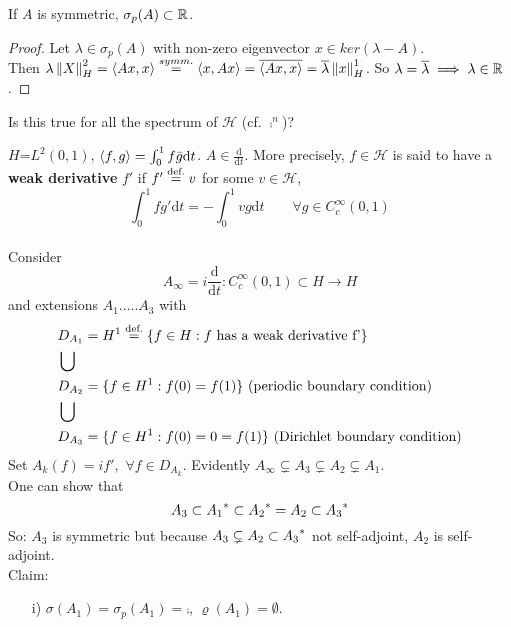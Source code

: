 \documentclass{article}
\begin{document}
\begin{lemma}
	If $A$ is symmetric, $\sigma_p(A)\subset\mathbb{R}$.

\end{lemma}
	\begin{proof}
		Let $\lambda\in\sigma_p(A)$ with non-zero eigenvector $x\in ker(\lambda-A)$. \\
		Then $\lambda\left\|{X}\right\|_H^2=\left<{Ax},{x}\right>\stackrel{symm.}{=}\left<{x},{Ax}\right>=\overline{\left<{Ax},{x}\right>}=\overline{\lambda}\left\|{x}\right\|_H^1$. So $\lambda=\overline{\lambda}\implies \lambda\in\mathbb{R}$.
	\end{proof}
Is this true for all the spectrum of $\mathcal{H}$ (cf. $\comp^n$)?
\begin{example}\nl
	$H$=$L^2(0,1)$, $\left<{f},{g}\right>=\int_0^1f\bar{g} \mathrm{d}t$. $A\in\frac{\mathrm{d}}{\mathrm{d}t}$. More precisely, $f\in\mathcal{H}$ is said to have a \textbf{weak derivative} $f'$ if $f'\stackrel{\text{def.}}{=}{v}$ for some $v\in \mathcal{H}$, 
 $$\int_0^1 fg'\mathrm{d}t=-\int_0^1 vg\mathrm{d}t \qquad \forall g\in C^\infty_c(0,1)$$\\
	Consider
	$$
		A_\infty =i\frac{\mathrm{d}}{\mathrm{d}t}:C^\infty_c(0,1)\subset H\to H
	$$
	and extensions $A_1$.....$A_3$ with
	\begin{equation}
		\begin{aligned}
			 & D_{A_1}=H^1\stackrel{\text{def.}}{=}\{f\in H: f \text{ has a weak derivative  f'}\} \\
			 & \bigcup                                                            \\
			 & D_{A_2}=\{f\in H^1:f(0)=f(1)\}\text{ (periodic boundary condition)}             \\
			 & \bigcup                                                            \\
			 & D_{A_3}=\{f\in H^1: f(0)=0=f(1)\}\text{ (Dirichlet boundary condition)}         \\
		\end{aligned}
	\end{equation}
	Set $A_k(f)=if',\,\,\forall f\in D_{A_k}$. Evidently $ A_\infty\subsetneq A_3\subsetneq A_2 \subsetneq A_1$.\\
	One can show that
	$$
		A_3\subset{A_1}^*\subset{A_2}^*=A_2\subset{A_3}^*
	$$
	So: $A_3$ is symmetric but because $A_3\subsetneq A_2\subset {A_3}^*$ not self-adjoint, $A_2$ is self-adjoint.\\
	Claim:
	\begin{itemize}
		\item [i)] $\sigma(A_1)=\sigma_p(A_1)=\comp$, $ \varrho(A_1)=\emptyset$.

\end{itemize}
\end{example}
\end{document}
